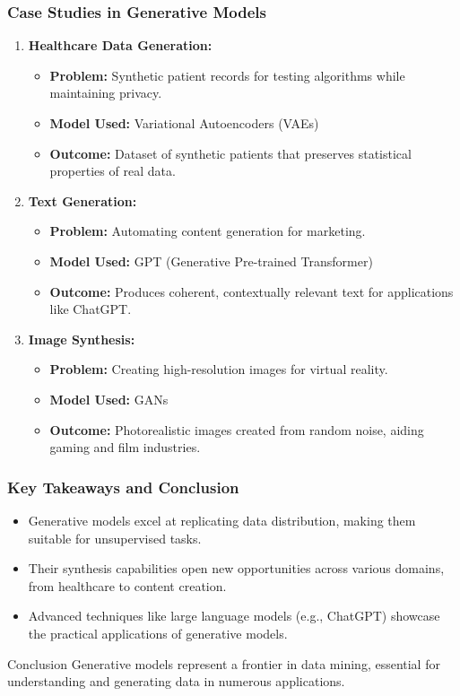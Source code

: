 \documentclass[aspectratio=169]{beamer}
\begin{document}
\begin{frame}[fragile]
    \frametitle{Case Studies in Generative Models}
    \begin{enumerate}
        \item \textbf{Healthcare Data Generation:}
            \begin{itemize}
                \item \textbf{Problem:} Synthetic patient records for testing algorithms while maintaining privacy.
                \item \textbf{Model Used:} Variational Autoencoders (VAEs)
                \item \textbf{Outcome:} Dataset of synthetic patients that preserves statistical properties of real data.
            \end{itemize}
        
        \item \textbf{Text Generation:}
            \begin{itemize}
                \item \textbf{Problem:} Automating content generation for marketing.
                \item \textbf{Model Used:} GPT (Generative Pre-trained Transformer)
                \item \textbf{Outcome:} Produces coherent, contextually relevant text for applications like ChatGPT.
            \end{itemize}
        
        \item \textbf{Image Synthesis:}
            \begin{itemize}
                \item \textbf{Problem:} Creating high-resolution images for virtual reality.
                \item \textbf{Model Used:} GANs
                \item \textbf{Outcome:} Photorealistic images created from random noise, aiding gaming and film industries.
            \end{itemize}
    \end{enumerate}
\end{frame}

\begin{frame}[fragile]
    \frametitle{Key Takeaways and Conclusion}
    \begin{itemize}
        \item Generative models excel at replicating data distribution, making them suitable for unsupervised tasks.
        \item Their synthesis capabilities open new opportunities across various domains, from healthcare to content creation.
        \item Advanced techniques like large language models (e.g., ChatGPT) showcase the practical applications of generative models.
    \end{itemize}
    \begin{block}{Conclusion}
        Generative models represent a frontier in data mining, essential for understanding and generating data in numerous applications.
    \end{block}
\end{frame}
\end{document}

